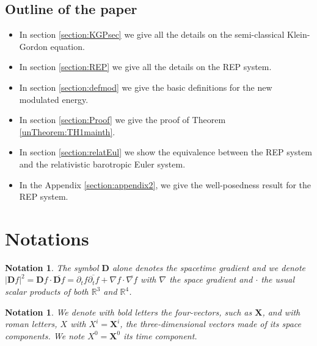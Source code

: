 \documentclass[a4paper, 15pt]{article}
\numberwithin{equation}{section}
\newtheorem{nota}[defi]{Notation}
\begin{document}
\subsection{Outline of the paper}
\label{subsection:outline}
\begin{itemize}
    \item In section \ref{section:KGPsec} we give all the details on the semi-classical Klein-Gordon equation.
    \item  In section \ref{section:REP} we give all the details on the REP system.
    \item In section \ref{section:defmod} we give the basic definitions for the new modulated energy.
    \item In section \ref{section:Proof} we give the proof of Theorem \ref{unTheorem:TH1mainth}. 
    \item In section \ref{section:relatEul} we show the equivalence between the REP system and the relativistic barotropic Euler system.
    \item In the Appendix \ref{section:appendix2}, we give the well-posedness result for the REP system.
\end{itemize}
\section{Notations}
\label{section:nota}

\begin{nota}
\label{nota:gradNOTA1}
    The symbol $\textbf{D}$ alone denotes the spacetime gradient and we denote $|\textbf{D} f|^2=\textbf{D}f\cdot\overline{\textbf{D}f}=\partial_tf\overline{\partial_tf}+\nabla f\cdot\overline{\nabla f}$ with $\nabla$ the space gradient and $\cdot$ the usual scalar products of both $\mathbb{R}^3$ and $\mathbb{R}^4$.\\
\end{nota}
\begin{nota}
\label{nota:gradNOTA2}
    We denote with bold letters the four-vectors, such as $\textbf{X}$, and with roman letters, $X$ with $X^i=\textbf{X}^i$, the three-dimensional vectors made of its space components. We note $X^0=\textbf{X}^0$ its time component.
\end{nota}
\end{document}
